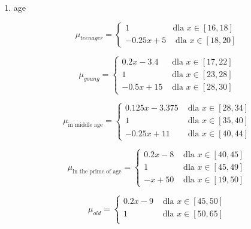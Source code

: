 \documentclass{classrep}
\begin{document}
\begin{enumerate}
  \item age

      \begin{equation}
        \mu_{teenager} =
          \begin{cases}
            1 & \text{dla } x \in [16,18] \\
            -0.25x +5 & \text{ dla } x \in [18,20]
          \end{cases}  
      \end{equation}

      \begin{equation}
        \mu_{young} =
        \begin{cases}
            0.2x-3.4 & \text{ dla } x \in [17,22]  \\
            1 & \text{ dla } x \in [23,28] \\
            -0.5x + 15 & \text{ dla } x \in [28,30]
          \end{cases}
      \end{equation}

      \begin{equation}
        \mu_{\text{in middle age}} =
                \begin{cases}
            0.125x-3.375 & \text{ dla } x \in [28,34]  \\
            1 & \text{ dla } x \in [35,40] \\
            -0.25x + 11 & \text{ dla } x \in [40,44]
          \end{cases}
      \end{equation} 

      \begin{equation}
        \mu_{\text{in the prime of age}} =
        \begin{cases}
            0.2x-8 & \text{ dla } x \in [40,45]  \\
            1 & \text{ dla } x \in [45,49] \\
            -x + 50 & \text{ dla } x \in [19,50]
          \end{cases}
      \end{equation} 

      \begin{equation}
        \mu_{old} =
        \begin{cases}
            0.2x-9 & \text{ dla } x \in [45,50]  \\
            1 & \text{ dla } x \in [50,65] \\
          \end{cases}
      \end{equation} 


\end{enumerate}
\end{document}
